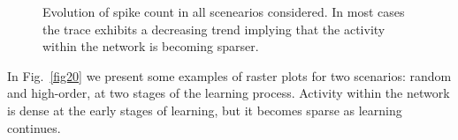 \documentclass[11pt,letterpaper]{article}
\begin{document}
\begin{figure}[t]
{				    \label{fig19:c}
			    }
			    \caption{
			        Evolution of spike count in all scenearios considered.
			        In most cases the trace exhibits a decreasing trend implying that the
			        activity within the network is becoming sparser.
			    }
			    \label{fig19}
		    \end{figure}		    
            
            In Fig.~\ref{fig20} we present some examples of raster plots for two scenarios: random and high-order, at
            two stages of the learning process.
            Activity within the network is dense at the early stages of learning, but it becomes sparse as learning
            continues.
\end{document}
